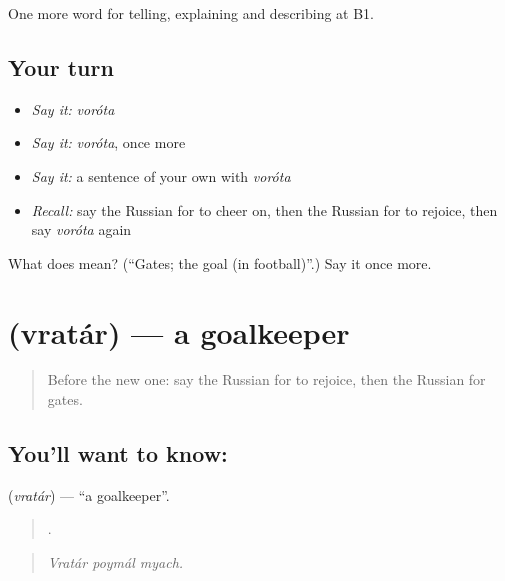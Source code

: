 \begin{grammarlens}[title={What you've built}]
One more word for telling, explaining and describing at B1.
\end{grammarlens}

\subsection*{Your turn}
\begin{itemize}
\raggedright
  \item \emph{Say it:} \emph{voróta}
  \item \emph{Say it:} \emph{voróta}, once more
  \item \emph{Say it:} a sentence of your own with \emph{voróta}
  \item \emph{Recall:} say the Russian for to cheer on, then the Russian for to rejoice, then say \emph{voróta} again
\end{itemize}

\begin{tcolorbox}[breakable,colback=teal!4,colframe=teal!35!black,title={Before you move on}]
What does  mean? (\textquotedblleft{}Gates; the goal (in football)\textquotedblright{}.) Say it once more.
\end{tcolorbox}
\section[\texorpdfstring{\ru{вратарь} (vratár)}{вратарь (vratár)}]{ (vratár) — a goalkeeper}

\label{lesson:RU-C509-vratar}



\begin{quote}
Before the new one: say the Russian for to rejoice, then the Russian for gates.
\end{quote}

\subsection*{You'll want to know: }
\textbf{} (\emph{vratár}) — \textquotedblleft{}a goalkeeper\textquotedblright{}.

\begin{quote}
  .
\end{quote}

\begin{quote}
\emph{Vratár poymál myach.}
\end{quote}

